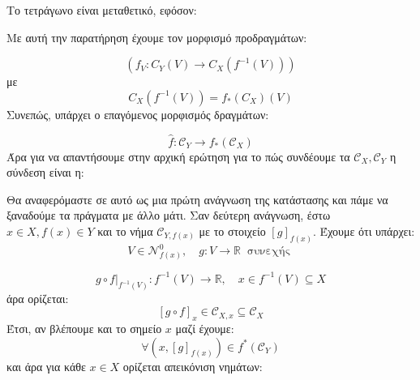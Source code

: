 \noindent Το τετράγωνο είναι μεταθετικό, εφόσον:

\begin{figure}[H]
    \centering
\end{figure}

\noindent Με αυτή την παρατήρηση έχουμε τον μορφισμό προδραγμάτων:

$$(f_V: C_Y(V) \longrightarrow C_X(f^{-1}(V)))$$ με $$C_X(f^{-1}(V)) = f_*(C_X)(V)$$ Συνεπώς, υπάρχει ο επαγόμενος μορφισμός δραγμάτων:

$$\hat{f} : \mathcal{C}_Y \longrightarrow f_*(\mathcal{C}_X) $$ Άρα για να απαντήσουμε στην αρχική ερώτηση για το πώς συνδέουμε τα $\mathcal{C}_X, \mathcal{C}_Y$ η σύνδεση είναι η:

\begin{figure}[H]
    \centering
\end{figure}

\noindent Θα αναφερόμαστε σε αυτό ως μια πρώτη ανάγνωση της κατάστασης και πάμε να ξαναδούμε τα πράγματα με άλλο μάτι. Σαν δεύτερη ανάγνωση, έστω $x \in X, f(x) \in Y$ και το νήμα $\mathcal{C}_{Y, f(x)}$ με το στοιχείο $[g]_{f(x)}$. Έχουμε ότι υπάρχει:
$$V \in \mathcal{N}^0_{f(x)}, \quad g:V\longrightarrow \mathbb{R} \ \text{ συνεχής }$$

$$g \circ f|_{f^{-1}(V)} : f^{-1}(V) \longrightarrow \mathbb{R}, \quad x \in f^{-1}(V) \subseteq X$$ άρα ορίζεται:
$$[g\circ f]_x \in \mathcal{C}_{X,x} \subseteq \mathcal{C}_X $$ Έτσι, αν βλέπουμε και το σημείο $x$ μαζί έχουμε:
$$\forall (x, [g]_{f(x)}) \in f^*(\mathcal{C}_Y)$$ και άρα για κάθε $x \in X$ ορίζεται απεικόνιση νημάτων:

